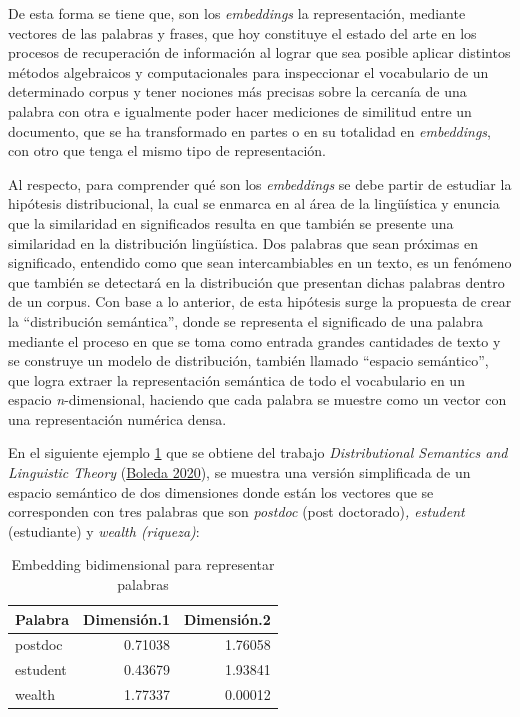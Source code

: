 \documentclass[
  12pt,
  openany]{book}
\begin{document}
De esta forma se tiene que, son los \emph{embeddings} la representación, mediante vectores de las palabras y frases, que hoy constituye el estado del arte en los procesos de recuperación de información al lograr que sea posible aplicar distintos métodos algebraicos y computacionales para inspeccionar el vocabulario de un determinado corpus y tener nociones más precisas sobre la cercanía de una palabra con otra e igualmente poder hacer mediciones de similitud entre un documento, que se ha transformado en partes o en su totalidad en \emph{embeddings}, con otro que tenga el mismo tipo de representación.~

Al respecto, para comprender qué son los \emph{embeddings} se debe partir de estudiar la hipótesis distribucional, la cual se enmarca en al área de la lingüística y enuncia que la similaridad en significados resulta en que también se presente una similaridad en la distribución lingüística. Dos palabras que sean próximas en significado, entendido como que sean intercambiables en un texto, es un fenómeno que también se detectará en la distribución que presentan dichas palabras dentro de un corpus. Con base a lo anterior, de esta hipótesis surge la propuesta de crear la ``distribución semántica'', donde se representa el significado de una palabra mediante el proceso en que se toma como entrada grandes cantidades de texto y se construye un modelo de distribución, también llamado ``espacio semántico'', que logra extraer la representación semántica de todo el vocabulario en un espacio \emph{n}-dimensional, haciendo que cada palabra se muestre como un vector con una representación numérica densa.

En el siguiente ejemplo \ref{tab:tblembedding} que se obtiene del trabajo \emph{Distributional Semantics and Linguistic Theory} (\protect\hyperlink{ref-boleda2020}{Boleda 2020}), se muestra una versión simplificada de un espacio semántico de dos dimensiones donde están los vectores que se corresponden con tres palabras que son \emph{postdoc} (post doctorado)\emph{, estudent} (estudiante) y \emph{wealth (riqueza)}:

\begin{table}

\caption{\label{tab:tblembedding}Embedding bidimensional para representar palabras}
\centering
\begin{tabular}[t]{lrr}
\toprule
Palabra & Dimensión.1 & Dimensión.2\\
\midrule
postdoc & 0.71038 & 1.76058\\
estudent & 0.43679 & 1.93841\\
wealth & 1.77337 & 0.00012\\
\bottomrule
\end{tabular}
\end{table}
\end{document}

